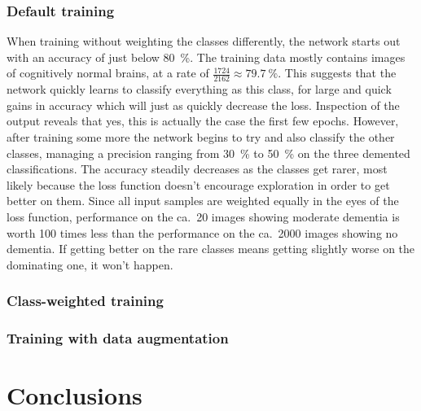 \documentclass{kththesis}
\begin{document}
\subsection{Default training}
When training without weighting the classes differently, the network starts out with an accuracy of just below 80~\%. The training data mostly contains images of cognitively normal brains, at a rate of $\frac{1724}{2162} \approx 79.7~\%$. This suggests that the network quickly learns to classify everything as this class, for large and quick gains in accuracy which will just as quickly decrease the loss. Inspection of the output reveals that yes, this is actually the case the first few epochs. However, after training some more the network begins to try and also classify the other classes, managing a precision ranging from 30~\% to 50~\% on the three demented classifications. The accuracy steadily decreases as the classes get rarer, most likely because the loss function doesn't encourage exploration in order to get better on them. Since all input samples are weighted equally in the eyes of the loss function, performance on the ca.\ 20 images showing moderate dementia is worth 100 times less than the performance on the ca.\ \num{2000} images showing no dementia. If getting better on the rare classes means getting slightly worse on the dominating one, it won't happen.

\subsection{Class-weighted training}


\subsection{Training with data augmentation}

\chapter{Conclusions}

\printbibliography[heading=bibintoc]

\appendix


\tailmatter
\end{document}
